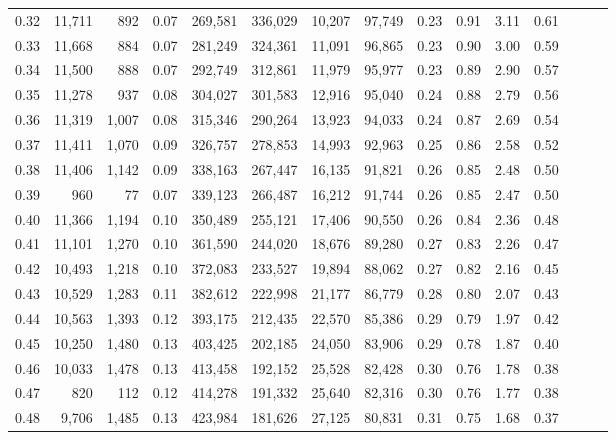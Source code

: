 \begin{tabular}{rrrrrrrrrrrrrrr}
0.32 &  11,711 &    892 &  0.07 &  269,581 &  336,029 &   10,207 &   97,749 &  0.23 &  0.91 &  3.11 &      0.61 \\
0.33 &  11,668 &    884 &  0.07 &  281,249 &  324,361 &   11,091 &   96,865 &  0.23 &  0.90 &  3.00 &      0.59 \\
0.34 &  11,500 &    888 &  0.07 &  292,749 &  312,861 &   11,979 &   95,977 &  0.23 &  0.89 &  2.90 &      0.57 \\
0.35 &  11,278 &    937 &  0.08 &  304,027 &  301,583 &   12,916 &   95,040 &  0.24 &  0.88 &  2.79 &      0.56 \\
0.36 &  11,319 &  1,007 &  0.08 &  315,346 &  290,264 &   13,923 &   94,033 &  0.24 &  0.87 &  2.69 &      0.54 \\
0.37 &  11,411 &  1,070 &  0.09 &  326,757 &  278,853 &   14,993 &   92,963 &  0.25 &  0.86 &  2.58 &      0.52 \\
0.38 &  11,406 &  1,142 &  0.09 &  338,163 &  267,447 &   16,135 &   91,821 &  0.26 &  0.85 &  2.48 &      0.50 \\
0.39 &     960 &     77 &  0.07 &  339,123 &  266,487 &   16,212 &   91,744 &  0.26 &  0.85 &  2.47 &      0.50 \\
0.40 &  11,366 &  1,194 &  0.10 &  350,489 &  255,121 &   17,406 &   90,550 &  0.26 &  0.84 &  2.36 &      0.48 \\
0.41 &  11,101 &  1,270 &  0.10 &  361,590 &  244,020 &   18,676 &   89,280 &  0.27 &  0.83 &  2.26 &      0.47 \\
0.42 &  10,493 &  1,218 &  0.10 &  372,083 &  233,527 &   19,894 &   88,062 &  0.27 &  0.82 &  2.16 &      0.45 \\
0.43 &  10,529 &  1,283 &  0.11 &  382,612 &  222,998 &   21,177 &   86,779 &  0.28 &  0.80 &  2.07 &      0.43 \\
0.44 &  10,563 &  1,393 &  0.12 &  393,175 &  212,435 &   22,570 &   85,386 &  0.29 &  0.79 &  1.97 &      0.42 \\
0.45 &  10,250 &  1,480 &  0.13 &  403,425 &  202,185 &   24,050 &   83,906 &  0.29 &  0.78 &  1.87 &      0.40 \\
0.46 &  10,033 &  1,478 &  0.13 &  413,458 &  192,152 &   25,528 &   82,428 &  0.30 &  0.76 &  1.78 &      0.38 \\
0.47 &     820 &    112 &  0.12 &  414,278 &  191,332 &   25,640 &   82,316 &  0.30 &  0.76 &  1.77 &      0.38 \\
0.48 &   9,706 &  1,485 &  0.13 &  423,984 &  181,626 &   27,125 &   80,831 &  0.31 &  0.75 &  1.68 &      0.37 \\

\end{tabular}
